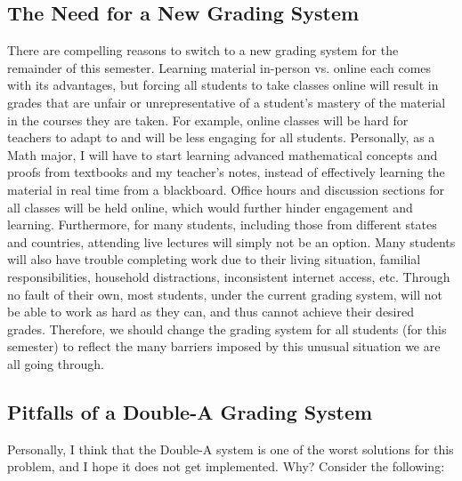 \documentclass[12pt]{article}
\begin{document}
\subsection{The Need for a New Grading System}
There are compelling reasons to switch to a new grading system for the remainder of this semester. Learning material in-person vs. online each comes with its advantages, but forcing all students to take classes online will result in grades that are unfair or unrepresentative of a student's mastery of the material in the courses they are taken. For example, online classes will be hard for teachers to adapt to and will be less engaging for all students. Personally, as a Math major, I will have to start learning advanced mathematical concepts and proofs from textbooks and my teacher's notes, instead of effectively learning the material in real time from a blackboard. Office hours and discussion sections for all classes will be held online, which would further hinder engagement and learning. Furthermore, for many students, including those from different states and countries, attending live lectures will simply not be an option. Many students will also have trouble completing work due to their living situation, familial responsibilities, household distractions, inconsistent internet access, etc. 
Through no fault of their own, most students, under the current grading system, will not be able to work as hard as they can, and thus cannot achieve their desired grades. Therefore, we should change the grading system for all students (for this semester) to reflect the many barriers imposed by this unusual situation we are all going through.

\newpage
\subsection{Pitfalls of a Double-A Grading System}
Personally, I think that the Double-A system is one of the worst solutions for this problem, and I hope it does not get implemented. Why? Consider the following:
\end{document}
